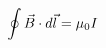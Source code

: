 \documentclass[preview]{standalone}
\begin{document}
\begin{align*}
\special{dvisvgm:raw <g id='unique000'>}\oint \vec{B} \cdot d\vec{l} = \mu_0 I\special{dvisvgm:raw </g>}
\end{align*}
\end{document}

